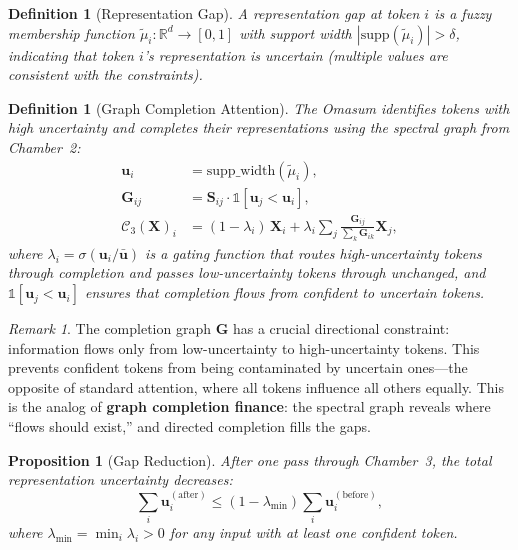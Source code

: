 \documentclass[twocolumn,10pt]{article}
\newtheorem{definition}[theorem]{Definition}
\newtheorem{proposition}[theorem]{Proposition}
\theoremstyle{remark}
\newtheorem{remark}[theorem]{Remark}
\newcommand{\chamber}[1]{\mathcal{C}_{#1}}
\begin{document}
\begin{definition}[Representation Gap]
\label{def:gap}
A \emph{representation gap} at token $i$ is a fuzzy membership function $\tilde{\mu}_i : \mathbb{R}^d \to [0,1]$ with support width $|\text{supp}(\tilde{\mu}_i)| > \delta$, indicating that token $i$'s representation is uncertain (multiple values are consistent with the constraints).
\end{definition}

\begin{definition}[Graph Completion Attention]
\label{def:graph_completion}
The Omasum identifies tokens with high uncertainty and completes their representations using the spectral graph from Chamber~2:
\begin{align}
    \mathbf{u}_i &= \text{supp\_width}(\tilde{\mu}_i), \label{eq:uncertainty} \\
    \mathbf{G}_{ij} &= \mathbf{S}_{ij} \cdot \mathbb{1}[\mathbf{u}_j < \mathbf{u}_i], \label{eq:completion_graph} \\
    \chamber{3}(\mathbf{X})_i &= (1 - \lambda_i) \, \mathbf{X}_i + \lambda_i \sum_j \frac{\mathbf{G}_{ij}}{\sum_k \mathbf{G}_{ik}} \mathbf{X}_j, \label{eq:omasum}
\end{align}
where $\lambda_i = \sigma(\mathbf{u}_i / \bar{\mathbf{u}})$ is a gating function that routes high-uncertainty tokens through completion and passes low-uncertainty tokens through unchanged, and $\mathbb{1}[\mathbf{u}_j < \mathbf{u}_i]$ ensures that completion flows from confident to uncertain tokens.
\end{definition}

\begin{remark}
The completion graph $\mathbf{G}$ has a crucial directional constraint: information flows only from low-uncertainty to high-uncertainty tokens.  This prevents confident tokens from being contaminated by uncertain ones---the opposite of standard attention, where all tokens influence all others equally.  This is the analog of \textbf{graph completion finance}: the spectral graph reveals where ``flows should exist,'' and directed completion fills the gaps.
\end{remark}

\begin{proposition}[Gap Reduction]
\label{prop:gap_reduction}
After one pass through Chamber~3, the total representation uncertainty decreases:
\begin{equation}
    \sum_i \mathbf{u}_i^{(\text{after})} \leq (1 - \lambda_{\min}) \sum_i \mathbf{u}_i^{(\text{before})},
    \label{eq:gap_reduction}
\end{equation}
where $\lambda_{\min} = \min_i \lambda_i > 0$ for any input with at least one confident token.
\end{proposition}
\end{document}
